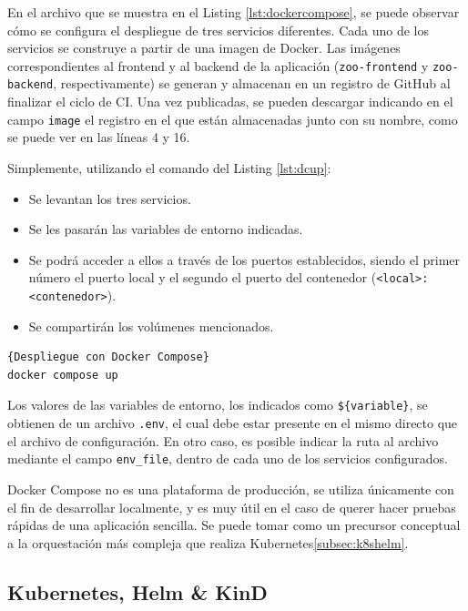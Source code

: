 En el archivo que se muestra en el Listing \ref{lst:dockercompose}, se puede observar cómo se configura el despliegue de tres servicios diferentes. Cada uno de los servicios se construye a partir de una imagen de Docker. Las imágenes correspondientes al frontend y al backend de la aplicación (\texttt{zoo-frontend} y \texttt{zoo-backend}, respectivamente) se generan y almacenan en un registro de GitHub al finalizar el ciclo de CI. Una vez publicadas, se pueden descargar indicando en el campo \texttt{image} el registro en el que están almacenadas junto con su nombre, como se puede ver en las líneas 4 y 16.

Simplemente, utilizando el comando del Listing \ref{lst:dcup}:

\begin{itemize}
  \item Se levantan los tres servicios.
  \item Se les pasarán las variables de entorno indicadas.
  \item Se podrá acceder a ellos a través de los puertos establecidos, siendo el primer número el puerto local y el segundo el puerto del contenedor (\texttt{<local>:<contenedor>}).
  \item Se compartirán los volúmenes mencionados.
\end{itemize}

\begin{lstlisting}[language=bash,label=lst:dcup]{Despliegue con Docker Compose}
docker compose up
\end{lstlisting}

Los valores de las variables de entorno, los indicados como \texttt{\$\{variable\}}, se obtienen de un archivo \texttt{.env}, el cual debe estar presente en el mismo directo que el archivo de configuración. En otro caso, es posible indicar la ruta al archivo mediante el campo \texttt{env\_file}, dentro de cada uno de los servicios configurados.

Docker Compose no es una plataforma de producción, se utiliza únicamente con el fin de desarrollar localmente, y es muy útil en el caso de querer hacer pruebas rápidas de una aplicación sencilla. Se puede tomar como un precursor conceptual a la orquestación más compleja que realiza Kubernetes\ref{subsec:k8shelm}.

\subsection*{Kubernetes, Helm \& KinD}
\label{subsec:k8shelm}

